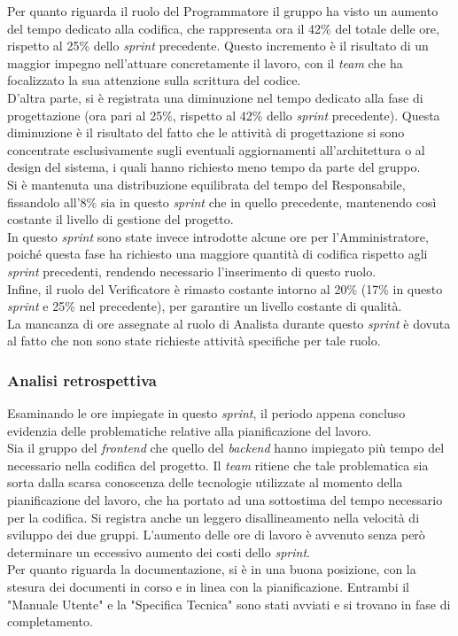 Per quanto riguarda il ruolo del Programmatore il gruppo ha visto un aumento del tempo dedicato alla codifica, che rappresenta ora il 42\% del totale delle ore,
rispetto al 25\% dello \textit{sprint} precedente.
Questo incremento è il risultato di un maggior impegno nell'attuare concretamente il lavoro, con il \textit{team} che ha focalizzato la sua attenzione sulla scrittura del codice.\\
D'altra parte, si è registrata una diminuzione nel tempo dedicato alla fase di progettazione (ora pari al 25\%, rispetto al 42\% dello \textit{sprint} precedente). Questa diminuzione è il risultato del fatto che le attività di progettazione si sono concentrate esclusivamente sugli eventuali aggiornamenti all'architettura o al design del sistema, i quali hanno richiesto meno tempo da parte del gruppo. \\
Si è mantenuta una distribuzione equilibrata del tempo del Responsabile, fissandolo all'8\% sia in questo \textit{sprint} che in quello precedente, mantenendo così costante il livello di gestione del progetto.\\
In questo \textit{sprint} sono state invece introdotte alcune ore per l'Amministratore, poiché questa fase ha richiesto una maggiore quantità di codifica rispetto agli \textit{sprint} precedenti, rendendo necessario l'inserimento di questo ruolo.\\
Infine, il ruolo del Verificatore è rimasto costante intorno al 20\% (17\% in questo \textit{sprint} e 25\% nel precedente), per garantire un livello costante di qualità.\\
La mancanza di ore assegnate al ruolo di Analista durante questo \textit{sprint} è dovuta al fatto che non sono state richieste attività specifiche per tale ruolo.

\subsubsection{Analisi retrospettiva}
Esaminando le ore impiegate in questo \textit{sprint}, il periodo appena concluso evidenzia delle problematiche relative alla pianificazione del lavoro.\\
Sia il gruppo del \textit{frontend} che quello del \textit{backend} hanno impiegato più tempo del necessario nella codifica del progetto.
Il \textit{team} ritiene che tale problematica sia sorta dalla scarsa conoscenza delle tecnologie utilizzate al momento della pianificazione del lavoro, che ha portato ad una sottostima del tempo necessario per la codifica.
Si registra anche un leggero disallineamento nella velocità di sviluppo dei due gruppi.
L'aumento delle ore di lavoro è avvenuto senza però determinare un eccessivo aumento dei costi dello \textit{sprint}.\\
Per quanto riguarda la documentazione, si è in una buona posizione, con la stesura dei documenti in corso e in linea con la pianificazione.
Entrambi il "Manuale Utente" e la "Specifica Tecnica" sono stati avviati e si trovano in fase di completamento.

